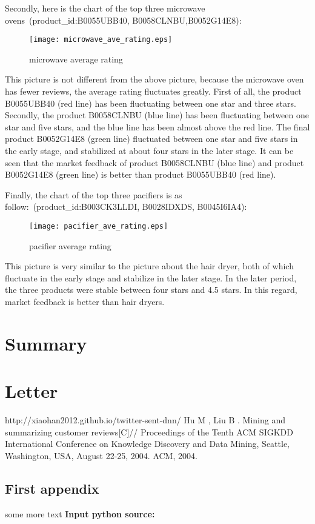 \documentclass{mcmthesis}
\begin{document}
Secondly, here is the chart of the top three microwave ovens\    (product\_id:B0055UBB40, B0058CLNBU,B0052G14E8):

\begin{figure}[H]
	\small
	\centering
	\texttt{[image: microwave\_ave\_rating.eps]}
	\caption{microwave average rating} \label{fig:micorwave average rating}
\end{figure}

This picture is not different from the above picture, because the microwave oven has fewer reviews, the average rating fluctuates greatly. First of all, the product B0055UBB40 (red line) has been fluctuating between one star and three stars. Secondly, the product B0058CLNBU (blue line) has been fluctuating between one star and five stars, and the blue line has been almost above the red line. The final product B0052G14E8 (green line) fluctuated between one star and five stars in the early stage, and stabilized at about four stars in the later stage. It can be seen that the market feedback of product B0058CLNBU (blue line) and product B0052G14E8 (green line) is better than product B0055UBB40 (red line).

Finally, the chart of the top three pacifiers is as follow:\ (product\_id:B003CK3LLDI, B0028IDXDS, B0045I6IA4):
\begin{figure}[H]
	\small
	\centering
	\texttt{[image: pacifier\_ave\_rating.eps]}
	\caption{pacifier average rating} \label{fig:pacifier average rating}
\end{figure}
This picture is very similar to the picture about the hair dryer, both of which fluctuate in the early stage and stabilize in the later stage. In the later period, the three products were stable between four stars and 4.5 stars. In this regard, market feedback is better than hair dryers.




\section{Summary}


\section{Letter}


\begin{thebibliography}{99}
	 http://xiaohan2012.github.io/twitter-sent-dnn/
	 Hu M , Liu B . Mining and summarizing customer reviews[C]// Proceedings of the Tenth ACM SIGKDD International Conference on Knowledge Discovery and Data Mining, Seattle, Washington, USA, August 22-25, 2004. ACM, 2004.
	
\end{thebibliography}

\begin{appendices}
	
	\section{First appendix}
	
	
	some more text \textcolor[rgb]{0.98,0.00,0.00}{\textbf{Input python source:}}
	
	
\end{appendices}
\end{document}
